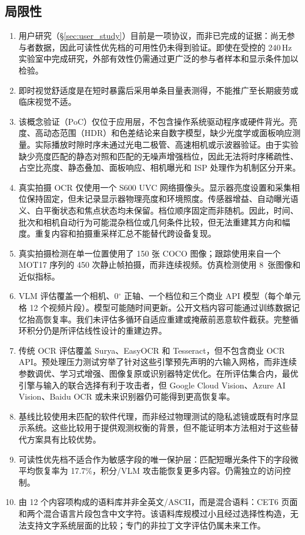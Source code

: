 \subsection{局限性}

\begin{enumerate}
\item 用户研究（\S\ref{sec:user_study}）目前是一项协议，而非已完成的证据：尚无参与者数据，因此可读性优先档的可用性仍未得到验证。即使在受控的 240\,Hz 实验室中完成研究，外部有效性仍需通过更广泛的参与者样本和显示条件加以检验。
\item 即时视觉舒适度是在短时暴露后采用单条目量表测得，不能推广至长期疲劳或临床视觉不适。
\item 该概念验证（PoC）仅位于应用层，不包含操作系统驱动程序或硬件背光。亮度、高动态范围（HDR）和色差结论来自数字模型，缺少光度学或面板响应测量。实际播放时隙时序未通过光电二极管、高速相机或示波器验证。由于实验缺少亮度匹配的静态对照和匹配的无噪声增强档位，因此无法将时序稀疏性、占空比亮度、静态叠加、面板响应、相机曝光和 ISP 处理作为机制区分开来。
\item 真实拍摄 OCR 仅使用一个 S600 UVC 网络摄像头。显示器亮度设置和采集相位保持固定，但未记录显示器物理亮度和环境照度。传感器增益、自动曝光语义、白平衡状态和焦点状态均未保留。档位顺序固定而非随机。因此，时间、批次和相机自动行为可能混杂档位或几何条件比较，但无法重建其方向和幅度。重复内容和拍摄重采样汇总不能替代跨设备复现。
\item 真实拍摄检测在单一位置使用了 150 张 COCO 图像；跟踪使用来自一个 MOT17 序列的 450 次静止帧拍摄，而非连续视频。仿真检测使用 8~张图像和近似指标。
\item VLM 评估覆盖一个相机、0$^{\circ}$ 正轴、一个档位和三个商业 API 模型（每个单元格 12 个视频片段）。模型可能随时间更新。公开文档内容可能通过训练数据记忆抬高恢复率。我们未评估多循环自适应重建或掩蔽前恶意软件截获。完整循环积分仍是所评估线性设计的重建边界。
\item 传统 OCR 评估覆盖 Surya、EasyOCR 和 Tesseract，但不包含商业 OCR API。预处理压力测试穷举了针对这些引擎预先声明的六输入网格，而非连续参数调优、学习式增强、图像复原或识别器特定优化。在所评估集合内，最优引擎与输入的联合选择有利于攻击者，但 Google Cloud Vision、Azure AI Vision、Baidu OCR 或未来识别器仍可能得到更高恢复率。
\item 基线比较使用未匹配的软件代理，而非经过物理测试的隐私滤镜或既有时序显示系统。这些比较用于提供观测权衡的背景，但不能证明本方法相对于这些替代方案具有比较优势。
\item 可读性优先档不适合作为敏感字段的唯一保护层：匹配短曝光条件下的字段微平均恢复率为 17.7\%，积分/VLM 攻击能恢复更多内容。仍需独立的访问控制。
\item 由 12 个内容项构成的语料库并非全英文/ASCII，而是混合语料：CET6 页面和两个混合语言片段包含中文字符。该语料库规模过小且经过选择性构造，无法支持文字系统层面的比较；专门的非拉丁文字评估仍属未来工作。
\end{enumerate}



